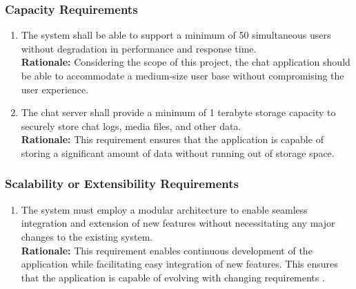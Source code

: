 \documentclass[]{article}
\begin{document}
\subsubsection{Capacity Requirements}
\label{ssub:capacity_requirements}
\begin{enumerate}[{PR-C}1. ]
	\item The system shall be able to support a minimum of 50 simultaneous users without degradation in performance and response time. \\
	      {\bf Rationale:} Considering the scope of this project, the chat application should be able to accommodate a medium-size user base without
	      compromising the user experience.
	\item The chat server shall provide a minimum of 1 terabyte storage capacity to securely store chat logs, media files, and other data. \\
	      {\bf Rationale:} This requirement ensures that the application is capable of storing a significant amount of data without running out
	      of storage space.
\end{enumerate}

\subsubsection{Scalability or Extensibility Requirements}
\label{ssub:scalability_or_extensibility_requirements}
\begin{enumerate}[{PR-SE}1. ]
	\item The system must employ a modular architecture to enable seamless integration and extension of new features
	      without necessitating any major changes to the existing system. \\
	      {\bf Rationale:} This requirement enables continuous development of the application while facilitating easy integration of new
	      features. This ensures that the application is capable of evolving with changing requirements
	      \cite{7c}.
\end{enumerate}
\end{document}
